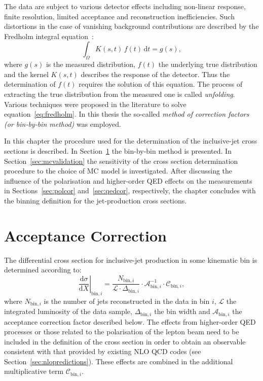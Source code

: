 The data are subject to various detector effects including non-linear response, finite resolution, limited acceptance and reconstruction inefficiencies. Such distortions in the case of vanishing background contributions are described by the Fredholm integral equation~\cite{Behnke:2013pga}:
\begin{equation}
 \int_\Omega K\left(s,t\right)\,f\left(t\right)\,\mathrm{d}t = g\left(s\right),
 \label{eq:fredholm}
\end{equation}
where $g\left(s\right)$ is the measured distribution, $f\left(t\right)$ the underlying true distribution and the kernel $K\left(s,t\right)$ describes the response of the detector. Thus the determination of $f\left(t\right)$ requires the solution of this equation.
The process of extracting the true distribution from the measured one is called \emph{unfolding}. Various techniques were proposed in the literature to solve equation~\ref{eq:fredholm}. In this thesis the so-called \emph{method of correction factors (or bin-by-bin method)} was employed.

In this chapter the procedure used for the determination of the inclusive-jet cross sections is described. In Section~\ref{sec:acccor} the bin-by-bin method is presented. In Section~\ref{sec:mcvalidation} the sensitivity of the cross section determination procedure to the choice of MC model is investigated. After discussing the influence of the polarisation and higher-order QED effects on the measurements in Sections~\ref{sec:polcor} and~\ref{sec:qedcor}, respectively, the chapter concludes with the binning definition for the jet-production cross sections.

\section{Acceptance Correction}
\label{sec:acccor}
The differential cross section for inclusive-jet production in some kinematic bin is determined according to:
\begin{equation}
 \left.\frac{\mathrm{d}\sigma}{\mathrm{d}X}\right|_{\mathrm{bin},i} = \frac{N_{\mathrm{bin},i}}{\mathcal{L} \cdot \Delta_{\mathrm{bin},i}} \cdot \mathcal{A}^{-1}_{\mathrm{bin},i} \cdot \mathcal{C}_{\mathrm{bin},i},
 \label{eq:csdef}
\end{equation}
where $N_{\mathrm{bin},i}$ is the number of jets reconstructed in the data in bin $i$, $\mathcal{L}$ the integrated luminosity of the data sample, $\Delta_{\mathrm{bin},i}$ the bin width and $\mathcal{A}_{\mathrm{bin},i}$ the acceptance correction factor described below. The effects from higher-order QED processes or those related to the polarisation of the lepton beam need to be included in the definition of the cross section in order to obtain an observable consistent with that provided by existing NLO QCD codes (see Section~\ref{sec:nlopredictions}). These effects are combined in the additional multiplicative term $\mathcal{C}_{\mathrm{bin},i}$.

